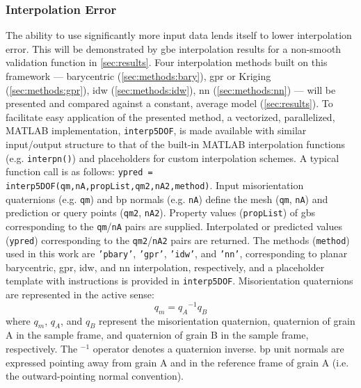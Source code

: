 \documentclass[preprint,12pt]{elsarticle}
\begin{document}
\subsubsection{Interpolation Error}
The ability to use significantly more input data lends itself to lower interpolation error. This will be demonstrated by \gls{gbe} interpolation results for a non-smooth validation function in \cref{sec:results}.
Four interpolation methods built on this framework --- barycentric (\cref{sec:methods:bary}), \gls{gpr} or Kriging (\cref{sec:methods:gpr}), \gls{idw} (\cref{sec:methods:idw}), \gls{nn} (\cref{sec:methods:nn}) --- will be presented and compared against a constant, average model (\cref{sec:results}). To facilitate easy application of the presented method, a vectorized, parallelized, MATLAB implementation, \texttt{interp5DOF}, is made available \cite{bairdFiveDegreeofFreedom5DOF2020} with similar input/output structure to that of the built-in MATLAB interpolation functions (e.g. \texttt{interpn()}) and placeholders for custom interpolation schemes. A typical function call is as follows: \texttt{ypred = interp5DOF(qm,nA,propList,qm2,nA2,method)}. Input misorientation quaternions (e.g. \texttt{qm}) and \gls{bp} normals (e.g. \texttt{nA}) define the mesh (\texttt{qm}, \texttt{nA}) and prediction or query points (\texttt{qm2}, \texttt{nA2}). Property values (\texttt{propList}) of \glspl{gb} corresponding to the \texttt{qm}/\texttt{nA} pairs are supplied. Interpolated or predicted values (\texttt{ypred}) corresponding to the \texttt{qm2}/\texttt{nA2} pairs are returned. The methods (\texttt{method}) used in this work are \texttt{'pbary'}, \texttt{'gpr'}, \texttt{'idw'}, and \texttt{'nn'}, corresponding to planar barycentric, \gls{gpr}, \gls{idw}, and \gls{nn} interpolation, respectively, and a placeholder template with instructions is provided in \texttt{interp5DOF}. Misorientation quaternions are represented in the active sense:
\begin{equation}
    q_m = {q_A}^{-1}q_B
\end{equation}
where $q_m$, $q_A$, and $q_B$ represent the misorientation quaternion, quaternion of grain A in the sample frame, and quaternion of grain B in the sample frame, respectively. The $^{-1}$ operator denotes a quaternion inverse. \Gls{bp} unit normals are expressed pointing away from grain A and in the reference frame of grain A (i.e. the outward-pointing normal convention).
\end{document}
